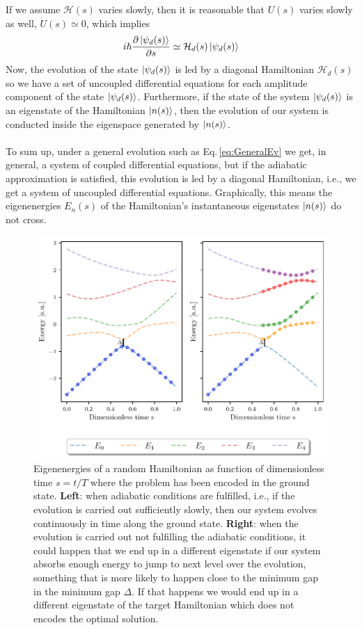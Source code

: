 If we assume $\mathcal{H}(s)$ varies slowly, then it is reasonable that $U(s)$ varies slowly as well, $\dot{U}(s) \simeq 0$, which implies
\begin{equation}
    i\hbar  \frac{\partial \ket{\psi_{d}(s)}}{\partial s} \simeq \mathcal{H}_{d}(s)\ket{\psi_{d}(s)}
\end{equation}
Now, the evolution of the state $\ket{\psi_{d}(s)}$ is led by a diagonal Hamiltonian $\mathcal{H}_{d}(s)$ so we have a set of uncoupled differential equations for each amplitude component of the state $\ket{\psi_{d}(s)}$. Furthermore, if the state of the system $\ket{\psi_{d}(s)}$ is an eigenstate of the Hamiltonian $\ket{n(s)}$, then the evolution of our system is conducted inside the eigenspace generated by $\ket{n(s)}$.\\\\
To sum up, under a general evolution such as Eq.\,\eqref{eq:GeneralEv} we get, in general, a system of coupled differential equations, but if the adiabatic approximation is satisfied, this evolution is led by a diagonal Hamiltonian, i.e., we get a system of uncoupled differential equations. Graphically, this means the eigenenergies $E_{n}(s)$ of the Hamiltonian's instantaneous eigenstates $\ket{n(s)}$ do not cross.
\begin{figure}[H]
    \centering
\includegraphics[width=\textwidth]{Figures/Eigenenergies.pdf}
    \caption{Eigenenergies of a random Hamiltonian as function of dimensionless time $s=t/T$ where the problem has been encoded in the ground state. \textbf{Left}: when adiabatic conditions are fulfilled, i.e., if the evolution is carried out sufficiently slowly, then our system evolves continuously in time along the ground state. \textbf{Right}: when the evolution is carried out not fulfilling the adiabatic conditions, it could happen that we end up in a different eigenstate if our system absorbs enough energy to jump to next level over the evolution, something that is more likely to happen close to the minimum gap in the minimum gap $\Delta$. If that happens we would end up in a different eigenstate of the target Hamiltonian which does not encodes the optimal solution.}
    \label{fig:Eigenenergies}
\end{figure}
